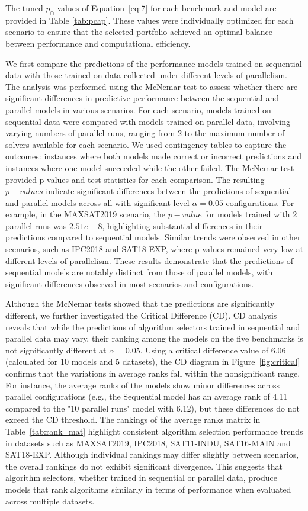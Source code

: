 The tuned $p_{\cap}$ values of Equation~\ref{eq:7} for each benchmark and model are provided in Table \ref{tab:pcap}. These values were individually optimized for each scenario to ensure that the selected portfolio achieved an optimal balance between performance and computational efficiency.

We first compare the predictions of the performance models trained on sequential data with those trained on data collected under different levels of parallelism. The analysis was performed using the McNemar test to assess whether there are significant differences in predictive performance between the sequential and parallel models in various scenarios. For each scenario, models trained on sequential data were compared with models trained on parallel data, involving varying numbers of parallel runs, ranging from 2 to the maximum number of solvers available for each scenario. We used contingency tables to capture the outcomes: instances where both models made correct or incorrect predictions and instances where one model succeeded while the other failed. The McNemar test provided p-values and test statistics for each comparison. The resulting $p-values$ indicate significant differences between the predictions of sequential and parallel models across all with significant level $\alpha = 0.05$ configurations. For example, in the MAXSAT2019 scenario, the $p-value$ for models trained with 2 parallel runs was $2.51e-8$, highlighting substantial differences in their predictions compared to sequential models. Similar trends were observed in other scenarios, such as IPC2018 and SAT18-EXP, where p-values remained very low at different levels of parallelism. These results demonstrate that the predictions of sequential models are notably distinct from those of parallel models, with significant differences observed in most scenarios and configurations.

Although the McNemar tests showed that the predictions are significantly different, we further investigated the Critical Difference (CD). CD analysis reveals that while the predictions of algorithm selectors trained in sequential and parallel data may vary, their ranking among the models on the five benchmarks is not significantly different at $\alpha = 0.05$. Using a critical difference value of 6.06 (calculated for 10 models and 5 datasets), the CD diagram in Figure~\ref{fig:critical} confirms that the variations in average ranks fall within the nonsignificant range. For instance, the average ranks of the models show minor differences across parallel configurations (e.g., the Sequential model has an average rank of 4.11 compared to the "10 parallel runs" model with 6.12), but these differences do not exceed the CD threshold. The rankings of the average ranks matrix in Table~\ref{tab:rank_mat} highlight consistent algorithm selection performance trends in datasets such as MAXSAT2019, IPC2018, SAT11-INDU, SAT16-MAIN and SAT18-EXP. Although individual rankings may differ slightly between scenarios, the overall rankings do not exhibit significant divergence. This suggests that algorithm selectors, whether trained in sequential or parallel data, produce models that rank algorithms similarly in terms of performance when evaluated across multiple datasets. 

